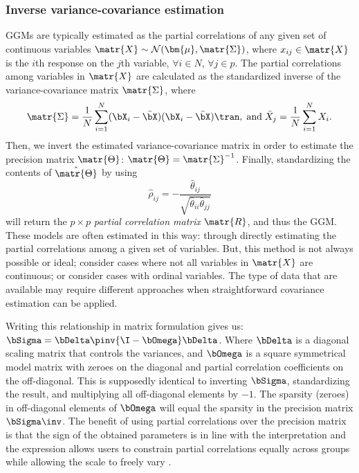 \subsubsection{Inverse variance-covariance estimation}
GGMs are typically estimated as the partial correlations of any given set of continuous variables $\matr{X} \sim \mathcal{N}(\bm{\mu}, \matr{\Sigma})$, where $x_{ij} \in \matr{X}$ is the $i$th response on the $j$th variable, $\forall i \in N$, $\forall j \in p$. The partial correlations among variables in $\matr{X}$ are calculated as the standardized inverse of the variance-covariance matrix $\matr{\Sigma}$, where
\begin{equation}
    \matr{\Sigma} = \frac{1}{N} \sum_{i = 1}^N (\bX_{i} - \bar{\bX}) (\bX_{i} - \bar{\bX})\tran, \; \text{and} \; \bar{X}_j = \frac{1}{N} \sum_{i = 1}^N X_i.
\end{equation}
Then, we invert the estimated variance-covariance matrix in order to estimate the precision matrix $\matr{\Theta}$: ${\matr{\Theta}} = {\matr{\Sigma}}^{-1}$. Finally, standardizing the contents of $\hat{\matr{\Theta}}$ by using
\begin{equation}
    \hat{\rho}_{ij} = -\frac{\hat{\theta}_{ij}}{\sqrt{\hat{\theta}_{ii} \hat{\theta}_{jj}}}
\end{equation}
will return the $p \times p$ \textit{partial correlation matrix} $\matr{R}$, and thus the GGM. These models are often estimated in this way: through directly estimating the partial correlations among a given set of variables. But, this method is not always possible or ideal; consider cases where not all variables in $\matr{X}$ are continuous; or consider cases with ordinal variables. The type of data that are available may require different approaches when straightforward covariance estimation can be applied.

Writing this relationship in matrix formulation gives us: $\bSigma = \bDelta\pinv{\I - \bOmega}\bDelta$. Where $\bDelta$ is a diagonal scaling matrix that controls the variances, and $\bOmega$ is a square symmetrical model matrix with zeroes on the diagonal and partial correlation coefficients on the off-diagonal. This is supposedly identical to inverting $\bSigma$, standardizing the result, and multiplying all off-diagonal elements by $-1$. The sparsity (zeroes) in off-diagonal elements of $\bOmega$ will equal the sparsity in the precision matrix $\bSigma\inv$. The benefit of using partial correlations over the precision matrix is that the sign of the obtained parameters is in line with the interpretation and the expression allows users to constrain partial correlations equally across groups while allowing the scale to freely vary \cite{kan2019extending}.

